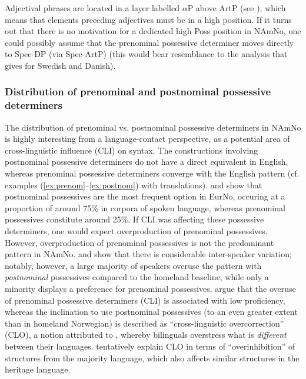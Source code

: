 \documentclass[output=paper,colorlinks,citecolor=brown]{langscibook}
\begin{document}
\noindent Adjectival phrases are located in a layer labelled $\alpha$P above ArtP (see ), which means that elements preceding adjectives must be in a high position.
If it turns out that there is no motivation for a dedicated high Poss position in NAmNo, one could possibly assume that the prenominal possessive determiner moves directly to Spec-DP (via Spec-ArtP) (this would bear resemblance to the analysis that \citealt[32--33]{faarlund2019syntax} gives for Swedish and Danish).

\subsubsection{Distribution of prenominal and postnominal possessive determiners}
The distribution of prenominal vs. postnominal possessive determiners in NAmNo is highly interesting from a language-contact perspective, as a potential area of  cross-linguistic influence (CLI) on syntax. The constructions involving postnominal possessive determiners do not have a direct equivalent in English, whereas prenominal possessive determiners converge with the English pattern (cf. examples (\ref{ex:prenom}--\ref{ex:postnom}) with translations). \citet{anderssenwestergaard2012tospraklighet} and \citet{westergaardanderssen2015word} show that postnominal possessives are the most frequent option in EurNo, occuring at a proportion of around 75\% in corpora of spoken language, whereas prenominal possessives constitute around 25\%.  If CLI was affecting these possessive determiners, one would expect overproduction of prenominal possessives. However, overproduction of prenominal possessives is not the predominant pattern in NAmNo. \citet{anderssenwestergaard2012tospraklighet, westergaardanderssen2015word} and \citet{anderssenetal2018cross-linguistic} show that there is considerable inter-speaker variation; notably, however, a large majority of speakers overuse the pattern with \emph{postnominal} possessives compared to the homeland baseline, while only a minority displays a preference for prenominal possessives. \citet{anderssenetal2018cross-linguistic} argue that the overuse of prenominal possessive determiners (CLI) is  associated with low proficiency, whereas the inclination to use postnominal possessives (to an even greater extent than in homeland Norwegian) is described as ``cross-linguistic overcorrection'' (CLO), a notion attributed to \citet{kupisch2014overcorr}, whereby bilinguals overstress what is \emph{different} between their languages. \citet{anderssenetal2018cross-linguistic} tentatively explain CLO in terms of ``overinhibition'' of structures from the majority language, which also affects similar structures in the heritage language. 
\end{document}
